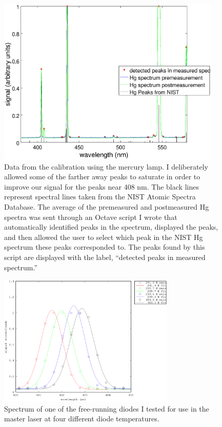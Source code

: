 \begin{figure}
\centering
\includegraphics[width=0.95\textwidth]{calibrationData.eps} 
\caption[Calibration spectrum from Hg lamp]{\label{calibrationData} Data from the calibration using the mercury lamp. I deliberately allowed some of the farther away peaks to saturate in order to improve our signal for the peaks near 408 nm. The black lines represent spectral lines taken from the NIST Atomic Spectra Database\cite{NISTasd}. The average of the premeasured and postmeasured Hg spectra was sent through an Octave script I wrote that automatically identified peaks in the spectrum, displayed the peaks, and then allowed the user to select which peak in the NIST Hg spectrum these peaks corresponded to. The peaks found by this script are displayed with the label, ``detected peaks in measured spectrum.''}
\end{figure}

\begin{figure}
\centering
\includegraphics[width=0.75\textwidth]{temperatureFit.eps} 
\caption[Wavelength of master laser at different temperatures]{\label{Temperaturespectra} Spectrum of one of the free-running diodes I tested for use in the master laser at four different diode temperatures.}
\end{figure}
%


